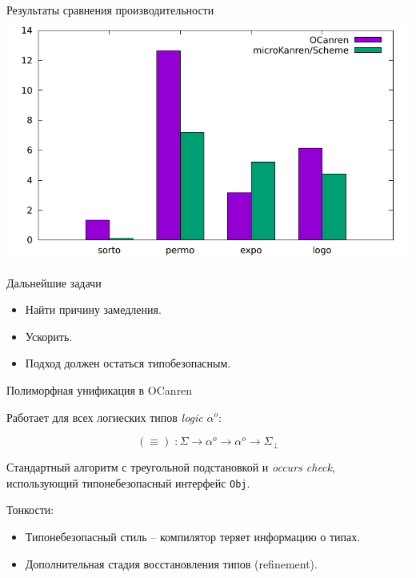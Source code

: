 \documentclass[10pt, mathserif]{beamer}
\newcommand{\oo}[1]{{#1}^o}
\theoremstyle{definition}
\begin{document}
% 
\begin{frame}{Результаты сравнения производительности}
\centering
\includegraphics[scale=0.85]{histo1.pdf}
\end{frame}

\begin{frame}[fragile]{Дальнейшие задачи}
  \begin{itemize}
  \item Найти причину замедления.
  \item Ускорить.
  \item Подход должен остаться типобезопасным.
  \end{itemize}

\end{frame}

\begin{frame}[fragile]{Полиморфная унификация в OCanren}

Работает для всех логиеских типов \emph{logic} $\oo{\alpha}$:

$$
(\equiv)\;\colon \Sigma\to\oo{\alpha}\to\oo{\alpha}\to\Sigma_{\perp}
$$
\pause

Стандартный алгоритм с треугольной подстановкой и \textit{occurs check}, использующий типонебезопасный интерфейс  \lstinline{Obj}.
\pause

\vspace{3em}
Тонкости:
\begin{itemize}
\item Типонебезопасный стиль -- компилятор теряет информацию о типах.
\item Дополнительная стадия восстановления типов (refinement).
\end{itemize}
\end{frame}
\end{document}
